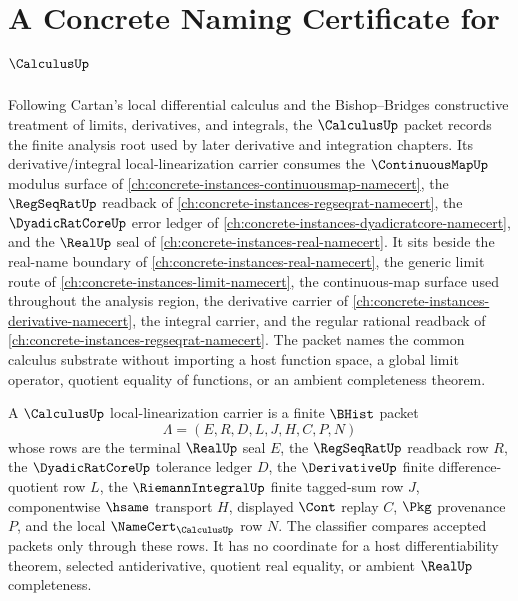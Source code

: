 \chapter{A Concrete Naming Certificate for $\CalculusUp$}
\label{ch:concrete-instances-calculus-namecert}

Following Cartan's local differential calculus and the Bishop--Bridges constructive treatment of limits, derivatives, and integrals, the $\CalculusUp$ packet records the finite analysis root used by later derivative and integration chapters. Its derivative/integral local-linearization carrier consumes the $\ContinuousMapUp$ modulus surface of \autoref{ch:concrete-instances-continuousmap-namecert}, the $\RegSeqRatUp$ readback of \autoref{ch:concrete-instances-regseqrat-namecert}, the $\DyadicRatCoreUp$ error ledger of \autoref{ch:concrete-instances-dyadicratcore-namecert}, and the $\RealUp$ seal of \autoref{ch:concrete-instances-real-namecert}. It sits beside the real-name boundary of \autoref{ch:concrete-instances-real-namecert}, the generic limit route of \autoref{ch:concrete-instances-limit-namecert}, the continuous-map surface used throughout the analysis region, the derivative carrier of \autoref{ch:concrete-instances-derivative-namecert}, the integral carrier, and the regular rational readback of \autoref{ch:concrete-instances-regseqrat-namecert}. The packet names the common calculus substrate without importing a host function space, a global limit operator, quotient equality of functions, or an ambient completeness theorem.

\begin{definition}
\label{def:calculus-local-linearization-carrier}
A $\CalculusUp$ local-linearization carrier is a finite $\BHist$ packet
$$
\Lambda=(E,R,D,L,J,H,C,P,N)
$$
whose rows are the terminal $\RealUp$ seal $E$, the $\RegSeqRatUp$ readback
row $R$, the $\DyadicRatCoreUp$ tolerance ledger $D$, the $\DerivativeUp$
finite difference-quotient row $L$, the $\RiemannIntegralUp$ finite
tagged-sum row $J$, componentwise $\hsame$ transport $H$, displayed $\Cont$
replay $C$, $\Pkg$ provenance $P$, and the local
$\NameCert_{\CalculusUp}$ row $N$. The classifier compares accepted packets
only through these rows. It has no coordinate for a host differentiability
theorem, selected antiderivative, quotient real equality, or ambient
$\RealUp$ completeness.
\end{definition}

